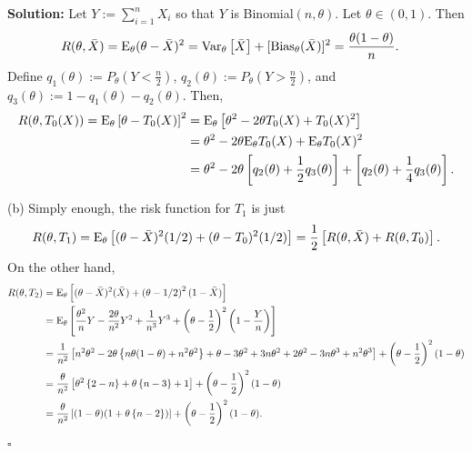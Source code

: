 \documentclass[12pt]{article}
\newcounter{ProofCounter}
\newenvironment{Solution}{\stepcounter{ProofCounter}\textbf{Solution:}}{\hfill$\square$}
\begin{document}
\begin{Solution}
  Let $Y := \sum_{i=1}^{n}X_{i}$ so that $Y$ is Binomial$(n, \theta)$. Let $\theta \in (0,1)$. Then 
  \begin{align*}
    R(\theta, \bar{X}) = \mathrm{E}_{\theta}(\theta - \bar{X})^{2} & = \mathrm{Var}_{\theta}\left[ \bar{X} \right] + [\text{Bias}_{\theta}(\bar{X})]^{2} =
    \frac{\theta(1-\theta)}{n}.
  \end{align*}
  Define $q_1(\theta) := P_{\theta}\left( Y < \frac{n}{2} \right)$, $q_2(\theta) := P_{\theta}\left( Y > \frac{n}{2} \right)$, and $q_3(\theta) := 1 -
  q_{1}(\theta) - q_2(\theta)$. Then,
  \begin{align*}
    R(\theta, T_0(X)) = \mathrm{E}_{\theta}\left[ \theta - T_0(X) \right]^2 & = \mathrm{E}_{\theta}\left[ \theta^2 - 2\theta T_0(X) + T_0(X)^2 \right] \\
    & = \theta^2 - 2\theta \mathrm{E}_{\theta}T_0(X) + \mathrm{E}_{\theta}T_{0}(X)^{2} \\
    & = \theta^2 - 2\theta\left[ q_2(\theta) + \frac{1}{2}q_3(\theta) \right] + \left[ q_2(\theta) + \frac{1}{4}q_3(\theta) \right].
  \end{align*}

  (b) Simply enough, the risk function for $T_1$ is just 
  \[
    R(\theta, T_1) = \mathrm{E}_{\theta}\left[ (\theta - \bar{X})^2(1/2) + (\theta - T_0)^2(1/2) \right] = \frac{1}{2}\left[R(\theta, \bar{X}) +
    R(\theta, T_0)\right].
  \]
  On the other hand,
  \begin{align*}
    R(\theta, T_2) & = \mathrm{E}_{\theta}\left[ (\theta - \bar{X})^2(\bar{X}) + \left( \theta - 1/2 \right)^2(1 - \bar{X}) \right] \\
    & = \mathrm{E}_{\theta}\left[ \frac{\theta^2}{n}Y - \frac{2\theta}{n^2}Y^2 + \frac{1}{n^3}Y^3 + \left( \theta - \frac{1}{2} \right)^2\left( 1 -
        \frac{Y}{n}
    \right) \right] \\
    & = \frac{1}{n^2}\left[ n^2\theta^2 - 2\theta\left\{ n\theta(1-\theta) + n^2\theta^2 \right\} + \theta - 3\theta^2 + 3n\theta^2 + 2\theta^2 -
    3n\theta^3 + n^2\theta^3 \right] + \left( \theta - \frac{1}{2} \right)^2(1 - \theta) \\
    & = \frac{\theta}{n^2}\left[ \theta^2\left\{ 2 - n \right\} + \theta\left\{ n-3 \right\} + 1 \right] + \left( \theta - \frac{1}{2} \right)^2(1 - \theta) \\
    & = \frac{\theta}{n^2}\left[ (1-\theta)(1 + \theta\left\{ n-2 \right\}) \right] + \left( \theta - \frac{1}{2} \right)^2(1 - \theta). \\
  \end{align*}
\end{Solution}
\end{document}
